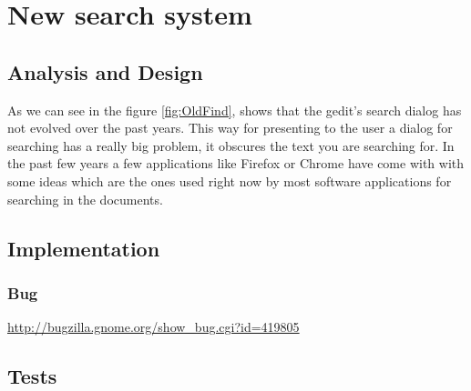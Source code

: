 
\chapter{New search system}

\section{Analysis and Design}


As we can see in the figure \ref{fig:OldFind}, shows that the gedit's search dialog has not evolved over the past years. This way for presenting to the user a dialog for searching has a really big problem, it obscures the text you are searching for. In the past few years a few applications like Firefox or Chrome have come with with some ideas which are the ones used right now by most software applications for searching in the documents.






\section{Implementation}

\subsection{Bug}

\url{http://bugzilla.gnome.org/show_bug.cgi?id=419805}

\section{Tests}

